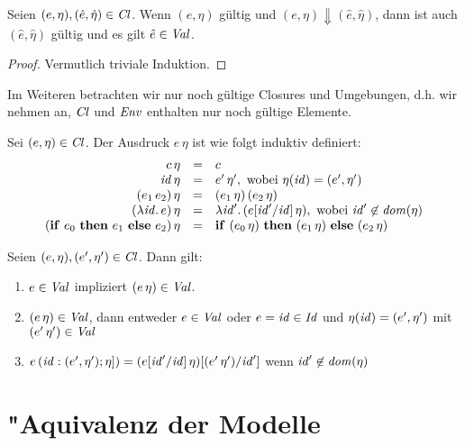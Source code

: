 \documentclass[12pt,fleqn,a4paper]{article}
\newcommand{\Cl}{\name{Cl}}
\begin{document}
\begin{lemma} \label{lemma:Wohldefiniertheit}
  Seien $(e,\eta),(\hat{e},\hat{\eta})\in\Cl$. Wenn $(e,\eta)$ g\"ultig und
  $(e,\eta) \Downarrow (\hat{e},\hat{\eta})$, dann ist auch $(\hat{e},\hat{\eta})$
  g\"ultig und es gilt $\hat{e}\in {\text{\it Val\/}}$.
\end{lemma}

\begin{proof}
  Vermutlich triviale Induktion.
\end{proof}

Im Weiteren betrachten wir nur noch g\"ultige Closures und Umgebungen, d.h. wir nehmen an,
$\Cl$ und ${\text{\it Env\/}}$ enthalten nur noch g\"ultige Elemente.

\begin{definition} \label{definition:Substitution}
  Sei $(e,\eta) \in \Cl$. Der Ausdruck $e\,\eta$ ist wie folgt
  induktiv definiert:
  \[\begin{array}{rcl}
    c\,\eta &=& c \\
    {\text{\it id\/}}\,\eta &=& e'\,\eta', \text{ wobei } \eta({\text{\it id\/}}) = (e',\eta') \\
    (e_1\,e_2)\,\eta &=& (e_1\,\eta)\,(e_2\,\eta) \\
    (\lambda {\text{\it id\/}}.\,e)\,\eta &=& \lambda {\text{\it id\/}}'.\,(e[{\text{\it id\/}}'/{\text{\it id\/}}]\,\eta), \text{ wobei } {\text{\it id\/}}'\not\in{\text{\it dom\/}}(\eta) \\
    (\mathbf{if}\ e_0\ \mathbf{then}\ e_1\ \mathbf{else}\ e_2)\,\eta &=& \mathbf{if}\ (e_0\,\eta)\ \mathbf{then}\ (e_1\,\eta)\ \mathbf{else}\ (e_2\,\eta)
  \end{array}\]
\end{definition}

\begin{lemma} \label{lemma:Substitution}
  Seien $(e,\eta), (e',\eta') \in \Cl$. Dann gilt:
  \begin{enumerate}
    \item $e\in{\text{\it Val\/}}$ impliziert $(e\,\eta)\in{\text{\it Val\/}}$.
    \item $(e\,\eta)\in{\text{\it Val\/}}$, dann entweder $e\in{\text{\it Val\/}}$ oder
          $e={\text{\it id\/}}\in{\text{\it Id\/}}$ und $\eta({\text{\it id\/}}) = (e',\eta')$ mit $(e'\,\eta')\in{\text{\it Val\/}}$
    \item $e\,({\text{\it id\/}}:(e',\eta');\eta]) = (e[{\text{\it id\/}}'/{\text{\it id\/}}]\,\eta)[(e'\,\eta')/{\text{\it id\/}}']$ wenn ${\text{\it id\/}}' \not\in {\text{\it dom\/}}(\eta)$
  \end{enumerate}
\end{lemma}


\section{"Aquivalenz der Modelle}
\end{document}
